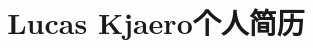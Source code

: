 \documentclass[margin]{res}
\title{Lucas Kjaero个人简历}
\begin{document}


\address{电话号码：+1 \(619\) 905-1772\\永久住址： San Diego, CA 92123}
\address{邮箱地址：\href{mailto:lucas@lucaskjaerozhang.com}{Lucas@LucasKjaeroZhang.com}\\个人网址：\href{https://www.lucaskjaerozhang.com}{www.LucasKjaeroZhang.com}}

\end{document}
